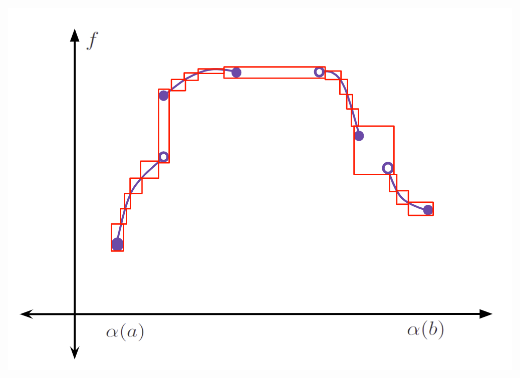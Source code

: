 \documentclass{book}
\begin{document}
\begin{center}
   \includegraphics[scale=0.55]{Integrability_rectangles.png}
\end{center}
\end{document}
